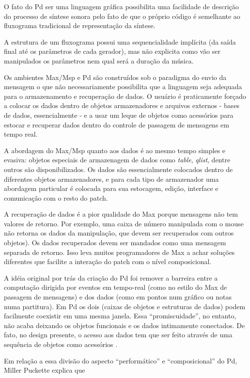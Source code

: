 \documentclass{ppgmus}
\begin{document}
O fato do Pd ser uma linguagem gráfica possibilita uma facilidade de
descrição do processo de síntese sonora pelo fato de que o próprio
código é semelhante ao fluxograma tradicional de representação da
síntese.

 A estrutura de um fluxograma
possui uma sequencialidade implícita (da saída final até os parâmetros
de cada gerador), mas não explicita como vão ser manipulados os
parâmetros nem qual será a duração da música.

Os ambientes Max/Msp e Pd são construídos sob o paradigma do envio
da mensagem o que não necessariamente possibilita que a linguagem seja
adequada para o armazenamento e recuperação de dados. O usuário é
praticamente forçado a colocar os dados dentro de objetos armazenadores e 
arquivos externos - bases
de dados, essencialmente - e a usar um leque de objetos como
acessórios para estocar e recuperar dados dentro do controle de
passagem de mensagens em tempo real.

A abordagem do Max/Msp quanto aos dados é ao mesmo tempo simples e
evasiva: objetos especiais de armazenagem de dados como
\textit{table}, \textit{qlist}, dentre outros são disponibilizados. Os
dados são essencialmente colocados dentro de diferentes objetos armazenadores, e
para cada tipo de armazenador uma abordagem particular é colocada
para sua estocagem, edição, interface e comunicação com o resto do
patch.

A recuperação de dados é a pior qualidade do Max porque mensagens não tem valores de
retorno. Por exemplo, uma caixa de número manipulada com o mouse não
retorna os dados da manipulação, que devem ser recuperados com outros
objetos). Os dados recuperados devem ser mandados como uma mensagem
separada de retorno. Isso leva muitos programadores de Max a achar
soluções diferentes que facilite a interação do patch com o nível
composicional.

A idéia original por trás da criação do Pd foi remover a barreira
entre a computação dirigida por eventos em tempo-real (como no estilo
do Max de passagem de mensagens) e dos dados (como em pontos num
gráfico ou notas numa partitura). Em Pd os dois (caixas de objetos e
estruturas de dados) podem facilmente coexistir em uma mesma janela.
Essa ``promiscuidade'', no entanto, não acaba deixando os objetos
funcionais e os dados intimamente conectados. De fato, no design
presente, o acesso aos dados tem que ser feito através de uma
sequência de objetos como acessórios .

Em relação a essa divisão do aspecto ``performático'' e
``composicional'' do Pd, Miller Puckette explica que
\end{document}
